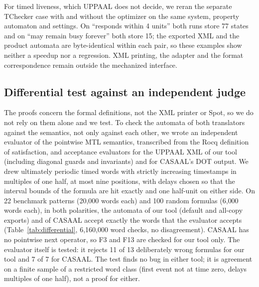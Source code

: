 For timed liveness, which UPPAAL does not decide, we reran the separate TChecker case with and without the optimizer on the same system, property automaton and settings. On ``responds within 4 units'' both runs store 77 states and on ``may remain busy forever'' both store 15; the exported XML and the product automata are byte-identical within each pair, so these examples show neither a speedup nor a regression. XML printing, the adapter and the format correspondence remain outside the mechanized interface.

\subsection{Differential test against an independent judge}
\label{sec:differential}
\begin{table}[tp]
\centering
\caption{Agreement of the automata with an independent evaluator of the MTL semantics on random ultimately periodic timed words (both polarities of each formula). A word check is one (formula, word, polarity) triple for one automaton; the words are ultimately periodic with delays that are multiples of one half and at most nine positions. CASAAL is checked on the 20 patterns it encodes (it has no next operator for F3 and F13). A disagreement is a word on which the automaton and the evaluator differ.}
\label{tab:differential}
\small

\end{table}
The proofs concern the formal definitions, not the XML printer or Spot, so we do not rely on them alone and we test. To check the automata of both translators against the semantics, not only against each other, we wrote an independent evaluator of the pointwise MTL semantics, transcribed from the Rocq definition of satisfaction, and acceptance evaluators for the UPPAAL XML of our tool (including diagonal guards and invariants) and for CASAAL's DOT output. We drew ultimately periodic timed words with strictly increasing timestamps in multiples of one half, at most nine positions, with delays chosen so that the interval bounds of the formula are hit exactly and one half-unit on either side. On 22 benchmark patterns (20{,}000 words each) and 100 random formulas (6{,}000 words each), in both polarities, the automata of our tool (default and all-copy exports) and of CASAAL accept exactly the words that the evaluator accepts (Table~\ref{tab:differential}, 6{,}160{,}000 word checks, no disagreement). CASAAL has no pointwise next operator, so F3 and F13 are checked for our tool only. The evaluator itself is tested: it rejects 11 of 13 deliberately wrong formulas for our tool and 7 of 7 for CASAAL. The test finds no bug in either tool; it is agreement on a finite sample of a restricted word class (first event not at time zero, delays multiples of one half), not a proof for either.

